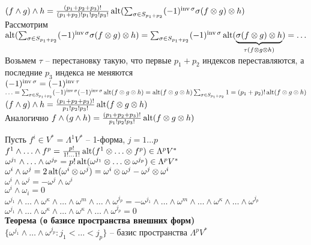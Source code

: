 \documentclass[12pt]{article}
\begin{document}
\begin{enumerate}
    $(f\land g) \land h = \frac{(p_1+p_2+p_3)!}{(p_1+p_2)!p_1!p_2!p_3!}\alt(\sum_{\sigma \in S_{p_1+p_2}} (-1)^{\inv\sigma}\sigma(f\otimes g)\otimes h)$\\
    Рассмотрим $\alt(\sum_{\sigma \in S_{p_1+p_2}} (-1)^{\inv\sigma}\sigma(f\otimes g)\otimes h) = \sum_{\sigma \in S_{p_1+p_2}} (-1)^{\inv\sigma}\alt(\ub{\tau(f\otimes g\otimes h)}{\sigma(f\otimes g)\otimes h}) = \ldots$\\
    Возьмем $\tau$ -- перестановку такую, что первые $p_1+p_2$ индексов переставляются, а последние $p_3$ индекса не меняются\\
    $(-1)^{\inv \sigma} = (-1)^{\inv \tau}$\\
    $\ldots = \sum_{\sigma \in S_{p_1+p_2}} (-1)^{\inv \sigma}(-1)^{\inv \sigma} \alt(f\otimes g \otimes h) = \alt(f\otimes g\otimes h)\sum_{\sigma \in S_{p_1+p_2}} 1 = (p_1+p_2)!\alt(f\otimes g \otimes h)$\\
    $(f\land g) \land h = \frac{(p_1+p_2+p_3)!}{p_1!p_2!p_3!}\alt(f\otimes g \otimes h)$\\
    Аналогично $f \land (g\land h) = \frac{(p_1+p_2+p_3)!}{p_1!p_2!p_3!}\alt(f\otimes g \otimes h)$
\end{enumerate}
Пусть $f^i \in V^* = \Lambda^1V^*$ -- 1-форма, $j = 1\ldots p$\\
$f^1\land \ldots \land f^p = \frac{p!}{1!\ldots1!} \alt(f^1\otimes \ldots \otimes f^p) \in \Lambda^p V^*$\\
$\omega^{j_1}\land \ldots \land \omega^{j_p} = p! \alt(\omega^{j_1}\otimes \ldots \otimes \omega^{j_p}) \in \Lambda^p V^*$\\
$\omega^i \land \omega^j = 2\alt(\omega^i \otimes \omega^j) = \omega^i\otimes \omega^j - \omega^j\otimes \omega^i$\\
$\omega^i\land \omega^j = -\omega^j\land \omega^i$\\
$\omega^i\land \omega_i = 0$\\
$\omega^{j_1}\land \ldots \land \omega^\kappa \land \ldots \land \omega^m \land \ldots \land \omega^{j_p} = -\omega^{j_1}\land \ldots \land \omega^m \land \ldots \land \omega^\kappa \land \ldots \land \omega^{j_p}$\\
$\omega^{j_1}\land \ldots \land \omega^\kappa \land \ldots \land \omega^\kappa \land \ldots \land \omega^{j_p} = 0$\\
\textbf{Теорема (о базисе пространства внешних форм)}\\
$\{ \omega^{j_1}\land \ldots \land \omega^{j_p}: j_1 < \ldots < j_p \}$ -- базис пространства $\Lambda^pV^*$\\
\end{document}
